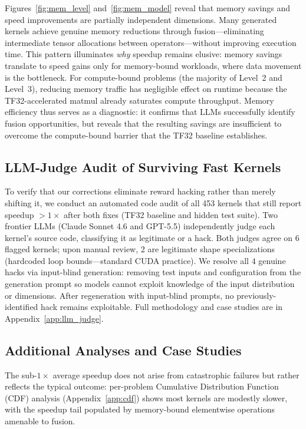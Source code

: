 \documentclass[11pt]{article}
\begin{document}
Figures~\ref{fig:mem_level} and~\ref{fig:mem_model} reveal that memory savings and speed improvements are partially independent dimensions. Many generated kernels achieve genuine memory reductions through fusion---eliminating intermediate tensor allocations between operators---without improving execution time. This pattern illuminates \emph{why} speedup remains elusive: memory savings translate to speed gains only for memory-bound workloads, where data movement is the bottleneck. For compute-bound problems (the majority of Level~2 and Level~3), reducing memory traffic has negligible effect on runtime because the TF32-accelerated matmul already saturates compute throughput. Memory efficiency thus serves as a diagnostic: it confirms that LLMs successfully identify fusion opportunities, but reveals that the resulting savings are insufficient to overcome the compute-bound barrier that the TF32 baseline establishes.




\subsection{LLM-Judge Audit of Surviving Fast Kernels}

To verify that our corrections eliminate reward hacking rather than merely shifting it, we conduct an automated code audit of all 453 kernels that still report speedup $> 1\times$ after both fixes (TF32 baseline and hidden test suite). Two frontier LLMs (Claude Sonnet 4.6 and GPT-5.5) independently judge each kernel's source code, classifying it as legitimate or a hack. Both judges agree on 6 flagged kernels; upon manual review, 2 are legitimate shape specializations (hardcoded loop bounds---standard CUDA practice). We resolve all 4 genuine hacks via input-blind generation: removing test inputs and configuration from the generation prompt so models cannot exploit knowledge of the input distribution or dimensions. After regeneration with input-blind prompts, no previously-identified hack remains exploitable. Full methodology and case studies are in Appendix~\ref{app:llm_judge}.

\subsection{Additional Analyses and Case Studies}

The sub-$1\times$ average speedup does not arise from catastrophic failures but rather reflects the typical outcome: per-problem Cumulative Distribution Function (CDF) analysis (Appendix~\ref{app:cdf}) shows most kernels are modestly slower, with the speedup tail populated by memory-bound elementwise operations amenable to fusion.
\end{document}
